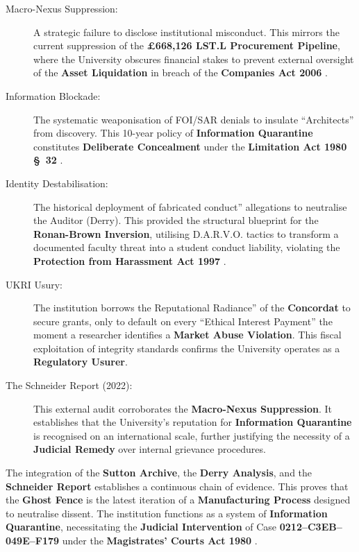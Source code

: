 \documentclass{EMBASSY}
\begin{document}
\begin{description}
	\item[Macro-Nexus Suppression:] A strategic failure to disclose institutional misconduct. This mirrors the current suppression of the \textbf{\pounds668,126 LST.L Procurement Pipeline}, where the University obscures financial stakes to prevent external oversight of the \textbf{Asset Liquidation} in breach of the \textbf{Companies Act 2006} \cite{CompaniesAct06}.
	\item[Information Blockade:] The systematic weaponisation of FOI/SAR denials to insulate ``Architects'' from discovery. This 10-year policy of \textbf{Information Quarantine} constitutes \textbf{Deliberate Concealment} under the \textbf{Limitation Act 1980 \S~32} \cite{LimitationAct80}.
	\item[Identity Destabilisation:] The historical deployment of fabricated conduct'' allegations to neutralise the Auditor (Derry). This provided the structural blueprint for the \textbf{Ronan-Brown Inversion}, utilising D.A.R.V.O. tactics to transform a documented faculty threat into a student conduct liability, violating the \textbf{Protection from Harassment Act 1997} \cite{PHA97}.
	\item[UKRI Usury:] The institution borrows the Reputational Radiance'' of the \textbf{Concordat} \cite{Concordat25} to secure grants, only to default on every ``Ethical Interest Payment'' the moment a researcher identifies a \textbf{Market Abuse Violation}. This fiscal exploitation of integrity standards confirms the University operates as a \textbf{Regulatory Usurer}.
	\item[The Schneider Report (2022):] This external audit \cite{Schneider2022} corroborates the \textbf{Macro-Nexus Suppression}. It establishes that the University’s reputation for \textbf{Information Quarantine} is recognised on an international scale, further justifying the necessity of a \textbf{Judicial Remedy} over internal grievance procedures.
\end{description}

\noindent The integration of the \textbf{Sutton Archive}, the \textbf{Derry Analysis}, and the \textbf{Schneider Report} establishes a continuous chain of evidence. This proves that the \textbf{Ghost Fence} is the latest iteration of a \textbf{Manufacturing Process} designed to neutralise dissent. The institution functions as a system of \textbf{Information Quarantine}, necessitating the \textbf{Judicial Intervention} of Case \textbf{0212--C3EB--049E--F179} under the \textbf{Magistrates' Courts Act 1980} \cite{MCA80}.
\end{document}
